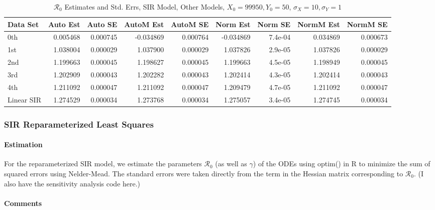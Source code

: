 \documentclass[12pt]{article}
\newcommand{\rr}{\ensuremath{\mathcal{R}_0}}
\begin{document}
\begin{table}[H]
	
	\caption{$\rr$ Estimates and Std. Errs, SIR Model,
		Other Models, $X_0 = 99950, Y_0 = 50$, 
		$\sigma_X = 10, \sigma_Y = 1$}
	\begin{footnotesize}
		\hskip -1cm
		\begin{tabular}{l|r|r|r|r|r|r|r|r}
			\hline
			Data Set & Auto Est & Auto SE & AutoM Est & AutoM SE & Norm Est & Norm SE & NormM Est & NormM SE\\
			\hline
			0th & 0.005468 & 0.000745 & -0.034869 & 0.000764 & -0.034869 & 7.4e-04 & 0.034869 & 0.000673\\
			\hline
			1st & 1.038004 & 0.000029 & 1.037900 & 0.000029 & 1.037826 & 2.9e-05 & 1.037826 & 0.000029\\
			\hline
			2nd & 1.199663 & 0.000045 & 1.198627 & 0.000045 & 1.199663 & 4.5e-05 & 1.198949 & 0.000045\\
			\hline
			3rd & 1.202909 & 0.000043 & 1.202282 & 0.000043 & 1.202414 & 4.3e-05 & 1.202414 & 0.000043\\
			\hline
			4th & 1.211092 & 0.000047 & 1.211092 & 0.000047 & 1.209479 & 4.7e-05 & 1.211092 & 0.000047\\
			\hline
			Linear SIR & 1.274529 & 0.000034 & 1.273768 & 0.000034 & 1.275057 & 3.4e-05 & 1.274745 & 0.000034\\
			\hline
		\end{tabular}
	\end{footnotesize}
\end{table}

\subsubsection{SIR Reparameterized Least Squares}

\paragraph{Estimation}

For the reparameterized SIR model, we estimate the parameters $\rr$ (as well as $\gamma$) of the ODEs using optim() in R to minimize the sum of squared errors using Nelder-Mead. The standard errors were taken directly from the term in the Hessian matrix corresponding to $\rr$. (I also have the sensitivity analysis code here.)

\paragraph{Comments}
\end{document}
